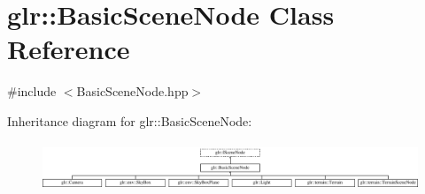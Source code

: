 \hypertarget{classglr_1_1BasicSceneNode}{\section{glr\-:\-:Basic\-Scene\-Node Class Reference}
\label{classglr_1_1BasicSceneNode}
}


{\ttfamily \#include $<$Basic\-Scene\-Node.\-hpp$>$}

Inheritance diagram for glr\-:\-:Basic\-Scene\-Node\-:\begin{figure}[H]
\begin{center}
\leavevmode
\includegraphics[height=1.465969cm]{classglr_1_1BasicSceneNode}
\end{center}
\end{figure}
